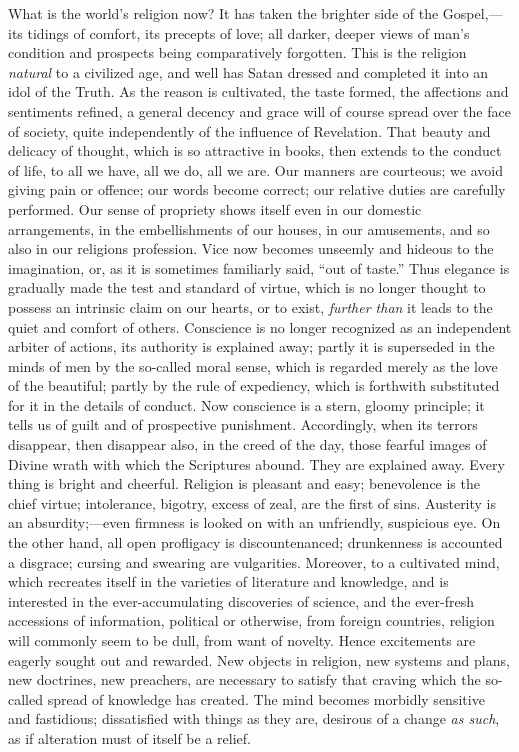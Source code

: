 What is the world's religion now? It has taken the
brighter side of the Gospel,—its tidings of comfort,
its precepts of love; all darker, deeper views of man's
condition and prospects being comparatively forgotten.
This is the religion \emph{natural} to a civilized age,
and well has Satan dressed and completed it into an idol
of the Truth. As the reason is cultivated, the taste
formed, the affections and sentiments refined, a general
decency and grace will of course spread over the face of
society, quite independently of the influence of
Revelation. That beauty and delicacy of thought, which is
so attractive in books, then extends to the conduct of
life, to all we have, all we do, all we are. Our manners
are courteous; we avoid giving pain or offence; our words
become correct; our relative duties are carefully
performed. Our sense of propriety shows itself even in
our domestic arrangements, in the embellishments of our
houses, in our amusements, and so also in our religions
profession. Vice now becomes unseemly and hideous to the
imagination, or, as it is sometimes familiarly said,
``out of taste.'' Thus elegance is gradually made
the test and standard of virtue, which is no longer
thought to possess an intrinsic claim on our hearts, or
to exist, \emph{further than} it leads to the quiet and
comfort of others. Conscience is no longer recognized as
an independent arbiter of actions, its authority is
explained away; partly it is superseded in the minds of
men by the so-called moral sense, which is regarded
merely as the love of the beautiful; partly by the rule
of expediency, which is forthwith substituted for it in
the details of conduct. Now conscience is a stern, gloomy
principle; it tells us of guilt and of prospective
punishment. Accordingly, when its terrors disappear, then
disappear also, in the creed of the day, those fearful
images of Divine wrath with which the Scriptures abound.
They are explained away. Every thing is bright and
cheerful. Religion is pleasant and easy; benevolence is
the chief virtue; intolerance, bigotry, excess of zeal,
are the first of sins. Austerity is an
absurdity;—even firmness is looked on with an
unfriendly, suspicious eye. On the other hand, all open
profligacy is discountenanced; drunkenness is accounted a
disgrace; cursing and swearing are vulgarities. Moreover,
to a cultivated mind, which recreates itself in the
varieties of literature and knowledge, and is interested
in the ever-accumulating discoveries of science, and the
ever-fresh accessions of information, political or
otherwise, from foreign countries, religion will commonly
seem to be dull, from want of novelty. Hence excitements
are eagerly sought out and rewarded. New objects in
religion, new systems and plans, new doctrines, new
preachers, are necessary to satisfy that craving which
the so-called spread of knowledge has created. The mind
becomes morbidly sensitive and fastidious; dissatisfied
with things as they are, desirous of a change \emph{as such},
as if alteration must of itself be a relief.

